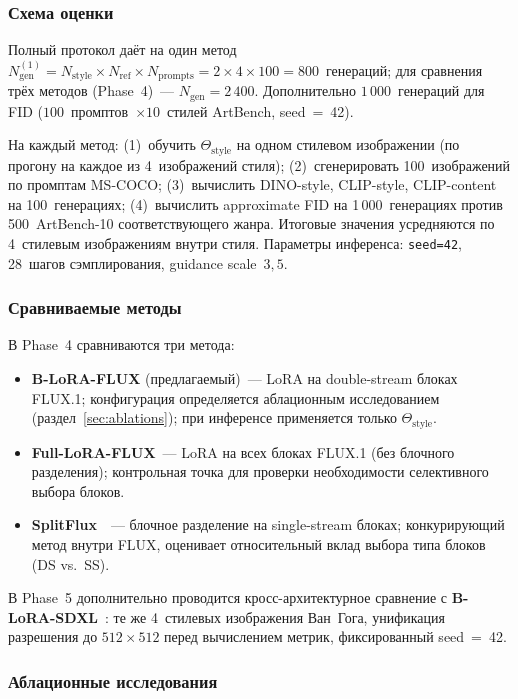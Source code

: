 \subsubsection*{Схема оценки}

Полный протокол даёт на один метод $N_\text{gen}^{(1)} = N_\text{style} \times N_\text{ref} \times N_\text{prompts} = 2 \times 4 \times 100 = 800$~генераций; для сравнения трёх методов (Phase~4)~--- $N_\text{gen}=2\,400$. Дополнительно $1\,000$~генераций для FID ($100$~промптов~$\times 10$~стилей ArtBench, seed~=~42).

На каждый метод: (1)~обучить $\Theta_\text{style}$ на одном стилевом изображении (по прогону на каждое из 4~изображений стиля); (2)~сгенерировать 100~изображений по промптам MS-COCO; (3)~вычислить DINO-style, CLIP-style, CLIP-content на 100~генерациях; (4)~вычислить approximate FID на 1\,000~генерациях против 500~ArtBench-10 соответствующего жанра. Итоговые значения усредняются по 4~стилевым изображениям внутри стиля. Параметры инференса: \texttt{seed=42}, 28~шагов сэмплирования, guidance scale~$3{,}5$.

\subsubsection*{Сравниваемые методы}

В Phase~4 сравниваются три метода:
\begin{itemize}\itemsep0.2em
    \item \textbf{B-LoRA-FLUX} (предлагаемый)~--- LoRA на double-stream блоках FLUX.1; конфигурация определяется аблационным исследованием (раздел~\ref{sec:ablations}); при инференсе применяется только $\Theta_\text{style}$.
    \item \textbf{Full-LoRA-FLUX}~--- LoRA на всех блоках FLUX.1 (без блочного разделения); контрольная точка для проверки необходимости селективного выбора блоков.
    \item \textbf{SplitFlux}~\cite{yang2025splitflux}~--- блочное разделение на single-stream блоках; конкурирующий метод внутри FLUX, оценивает относительный вклад выбора типа блоков (DS vs.\ SS).
\end{itemize}

В Phase~5 дополнительно проводится кросс-архитектурное сравнение с \textbf{B-LoRA-SDXL}~\cite{frenkel2024blora}: те же 4~стилевых изображения Ван~Гога, унификация разрешения до $512{\times}512$ перед вычислением метрик, фиксированный seed~=~42.

\subsubsection*{Аблационные исследования}
\label{sec:ablations}

